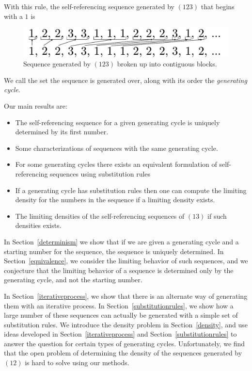 \documentclass[runningheads,a4paper]{llncs}
\begin{document}
With this rule, the self-referencing sequence generated by $(123)$ that begins with a $1$ is
\begin{figure}
\label{fig:onetwothree}
\center
\includegraphics[width=0.5\linewidth]{sequenceBlocks123.pdf}
\caption{Sequence generated by $(123)$ broken up into contiguous blocks.}
\end{figure}

We call the set the sequence is generated over, along with its order the \emph{generating cycle}.

Our main results are:
\begin{itemize}
\item The self-referencing sequence for a given generating cycle is uniquely determined by its first number.
\item Some characterizations of sequences with the same generating cycle.
\item For some generating cycles there exists an equivalent formulation of self-referencing sequences using substitution rules
\item If a generating cycle has substitution rules then one can compute the limiting density for the numbers in the sequence if a limiting density exists.
\item The limiting densities of the self-referencing sequences of  $(13)$ if such densities exists.
\end{itemize}

In Section~\ref{determinism} we show that if we are given a generating cycle and a starting number for the sequence, the sequence is uniquely determined. In Section~\ref{equivalence}, we consider the limiting behavior of such sequences, and we conjecture that the limiting behavior of a sequence is determined only by the generating cycle, and not the starting number. 

In Section~\ref{iterativeprocess}, we show that there is an alternate way of generating them with an iterative process. In Section~\ref{substitutionrules}, we show how a large number of these sequences can actually be generated with a simple set of substitution rules. We introduce the density problem in Section~\ref{density}, and use ideas developed in Section~\ref{iterativeprocess} and Section~\ref{substitutionrules} to answer the question for certain types of generating cycles. Unfortunately, we find that the open problem of determining the density of the sequences generated by $(12)$ is hard to solve using our methods.
\end{document}
